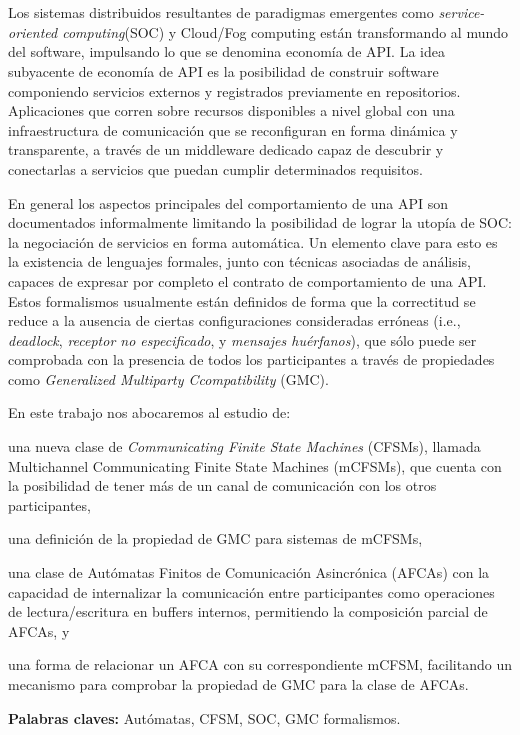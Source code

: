 \chapter*{\runtitulo}

Los sistemas distribuidos resultantes de paradigmas emergentes como \emph{service-oriented computing}(SOC) y Cloud/Fog computing están transformando al mundo del software, impulsando lo que se denomina economía de API. La idea subyacente de economía de API es la posibilidad de construir software componiendo servicios externos y registrados previamente en repositorios. Aplicaciones que corren sobre recursos disponibles a nivel global con una infraestructura de comunicación que se reconfiguran en forma dinámica y transparente, a través de un middleware dedicado capaz de descubrir y conectarlas a servicios que puedan cumplir determinados requisitos. 

En general los aspectos principales del comportamiento de una API son documentados informalmente limitando la posibilidad de lograr la utopía de SOC: la negociación de servicios en forma automática. Un elemento clave para esto es la existencia de lenguajes formales, junto con técnicas asociadas de análisis, capaces de expresar por completo el contrato de comportamiento de una API. Estos formalismos usualmente están definidos de forma que la correctitud se reduce a la ausencia de ciertas configuraciones consideradas erróneas (i.e., \emph{deadlock}, \emph{receptor no especificado}, y \emph{mensajes huérfanos}), que sólo puede ser comprobada con la presencia de todos los participantes a través de propiedades como \emph{Generalized Multiparty Ccompatibility} (GMC).

En este trabajo nos abocaremos al estudio de: 
\begin{inparaenum}[1)] 
\item una nueva clase de \emph{Communicating Finite State Machines} (CFSMs), llamada Multichannel Communicating Finite State Machines (mCFSMs), que cuenta con la posibilidad de tener más de un canal de comunicación con los otros participantes, 
\item una definición de la propiedad de GMC para sistemas de mCFSMs,
\item una clase de Autómatas Finitos de Comunicación Asincrónica (AFCAs) con la capacidad de internalizar la comunicación entre participantes como operaciones de lectura/escritura en buffers internos, permitiendo la composición parcial de AFCAs, y
\item una forma de relacionar un AFCA con su correspondiente mCFSM, facilitando un mecanismo para comprobar la propiedad de GMC para la clase de AFCAs.
\end{inparaenum}

\bigskip

\noindent\textbf{Palabras claves:} Autómatas, CFSM, SOC, GMC formalismos.